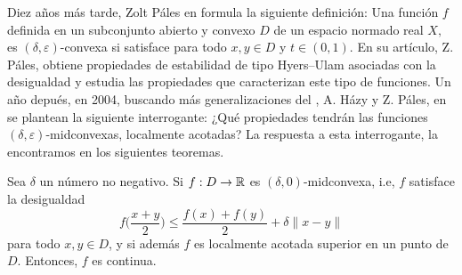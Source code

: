 Diez años más tarde, Zolt Páles en \cite{Pal03a} formula la siguiente
definición: Una función $f$ definida en un subconjunto abierto
y convexo $D$ de un espacio normado real $X,$ es $(\delta,\varepsilon)$-convexa
si satisface
para todo $x,y\in D$ y $t\in(0,1)$. En su artículo, Z. Páles, obtiene
propiedades de estabilidad de tipo Hyers--Ulam asociadas
con la desigualdad  y estudia las propiedades
que caracterizan este tipo de funciones. Un año depués,
en 2004, buscando más generalizaciones del , 
A. Házy y Z. Páles, en \cite{HazPal04} se plantean la siguiente interrogante:
¿Qué propiedades tendrán las funciones $(\delta,\varepsilon)$-midconvexas, 
localmente acotadas? La respuesta a esta interrogante, la encontramos
en los siguientes teoremas.

\begin{theorem}
\label{THazPal1}
Sea $\delta$ un número no negativo. Si $f:D\to\mathbb{R}$ es $(\delta,0)$-midconvexa,
i.e, $f$ satisface la desigualdad
$$
f\bigg(\frac{x+y}{2}\bigg) \leq \frac{f(x)+f(y)}{2}+\delta\|x-y\|
$$
para todo $x,y\in D$, y si además $f$ es localmente acotada superior en un punto
de $D$. Entonces, $f$ es continua.
\end{theorem}

